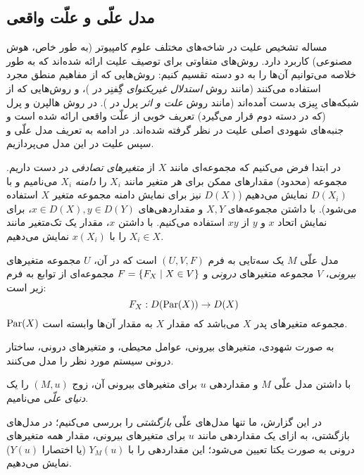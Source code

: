 \subsection{مدل علّی و علّت واقعی}\label{sec:causality}

مساله تشخیص علیت در شاخه‌های مختلف علوم کامپیوتر
(به طور خاص، هوش مصنوعی)
کاربرد دارد. روش‌های متفاوتی برای توصیف علیت ارائه شده‌اند
که به طور خلاصه می‌توانیم آن‌ها را به دو دسته تقسیم کنیم:
روش‌هایی که از مفاهیم منطق مجرد استفاده می‌کنند
(مانند روش
\textit{استدلال غیریکنوای}
گِفنِر در
\cite{geffner1990causal})،
و روش‌هایی که از شبکه‌های بِیزی بدست آمده‌اند
(مانند روش
\textit{علت و اثر}
پرل در
\cite{pearl1999reasoning}).
در روش هالپرن و پرل
(که در دسته دوم قرار می‌گیرد)
تعریف خوبی از علّت واقعی ارائه شده است و
جنبه‌های شهودی اصلی علیت در نظر گرفته شده‌اند.
در ادامه به تعریف مدل علّی
و سپس علیت در این مدل می‌پردازیم.

در ابتدا فرض می‌کنیم که مجموعه‌ای مانند
$X$
از
\textit{متغیرهای تصادفی}
در دست داریم.
مجموعه
(محدود)
مقدارهای ممکن برای هر متغیر مانند
$X_i$
را
\textit{دامنه} $X_i$
می‌نامیم و با
$D(X_i)$
نمایش می‌دهیم
($D(X)$
نیز برای نمایش دامنه مجموعه متغیر
$X$
استفاده می‌شود).
با داشتن مجموعه‌های
$X,Y$
و مقداردهی‌های
$x \in D(X), y \in D(Y)$،
برای نمایش اتحاد
$x$ و $y$
از
$xy$
استفاده می‌کنیم.
با داشتن
$x$،
مقدار یک تک‌متغیر
مانند
$X_i \in X$
را با
$x(X_i)$
نمایش می‌دهیم.

\begin{definition}\label{def:causal-model}
  مدل علّی
  $M$
  یک سه‌تایی به فرم
  $(U,V,F)$
  است که در آن،
  $U$
  مجموعه متغیرهای
  \textit{بیرونی}،
  $V$
  مجموعه متغیرهای
  \textit{درونی}
  و
  $F = \left\{ F_X \mid X \in V \right\}$
  مجموعه‌ای از توابع به فرم زیر است:
  \[ F_X: D(\operatorname{Par}(X)) \to D(X) \]
  $\operatorname{Par}(X)$
  مجموعه متغیرهای پدر
  $X$
  می‌باشد که مقدار
  $X$
  به مقدار آن‌ها وابسته است.
\end{definition}

به صورت شهودی، متغیرهای بیرونی، عوامل محیطی،
و متغیرهای درونی، ساختار درونی سیستم مورد نظر را
مدل می‌کنند.

\begin{definition}\label{def:causal-world}
  با داشتن مدل علّی
  $M$
  و مقداردهی
  $u$
  برای متغیرهای بیرونی آن،
  زوج
  $(M,u)$
  را یک
  \textit{دنیای علّی}
  می‌نامیم.
\end{definition}

در این گزارش، ما تنها مدل‌های علّی
\textit{بازگشتی}
را بررسی می‌کنیم؛ در مدل‌های بازگشتی،
به ازای یک مقداردهی مانند
$u$
برای متغیرهای بیرونی،
مقدار همه متغیرهای درونی
به صورت یکتا تعیین می‌شود؛
این مقداردهی را با
$Y_M(u)$ (یا اختصارا
$Y(u)$)
نمایش می‌دهیم.

